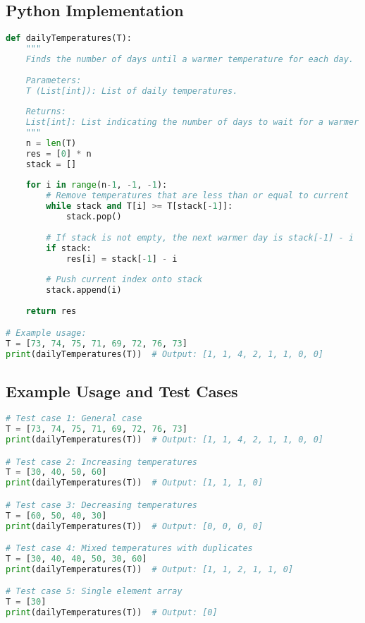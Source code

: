 \subsection*{Python Implementation}
\begin{fullwidth}
\begin{lstlisting}[language=Python]
def dailyTemperatures(T):
    """
    Finds the number of days until a warmer temperature for each day.
    
    Parameters:
    T (List[int]): List of daily temperatures.
    
    Returns:
    List[int]: List indicating the number of days to wait for a warmer temperature.
    """
    n = len(T)
    res = [0] * n
    stack = []
    
    for i in range(n-1, -1, -1):
        # Remove temperatures that are less than or equal to current
        while stack and T[i] >= T[stack[-1]]:
            stack.pop()
        
        # If stack is not empty, the next warmer day is stack[-1] - i
        if stack:
            res[i] = stack[-1] - i
        
        # Push current index onto stack
        stack.append(i)
    
    return res

# Example usage:
T = [73, 74, 75, 71, 69, 72, 76, 73]
print(dailyTemperatures(T))  # Output: [1, 1, 4, 2, 1, 1, 0, 0]
\end{lstlisting}
\end{fullwidth}

\subsection*{Example Usage and Test Cases}

\begin{lstlisting}[language=Python]
# Test case 1: General case
T = [73, 74, 75, 71, 69, 72, 76, 73]
print(dailyTemperatures(T))  # Output: [1, 1, 4, 2, 1, 1, 0, 0]

# Test case 2: Increasing temperatures
T = [30, 40, 50, 60]
print(dailyTemperatures(T))  # Output: [1, 1, 1, 0]

# Test case 3: Decreasing temperatures
T = [60, 50, 40, 30]
print(dailyTemperatures(T))  # Output: [0, 0, 0, 0]

# Test case 4: Mixed temperatures with duplicates
T = [30, 40, 40, 50, 30, 60]
print(dailyTemperatures(T))  # Output: [1, 1, 2, 1, 1, 0]

# Test case 5: Single element array
T = [30]
print(dailyTemperatures(T))  # Output: [0]
\end{lstlisting}

